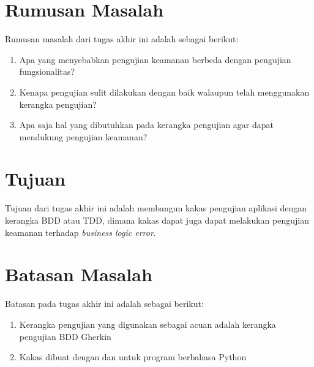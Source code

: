 \section{Rumusan Masalah}

Rumusan masalah dari tugas akhir ini adalah sebagai berikut:

\begin{enumerate}
      \item Apa yang menyebabkan pengujian keamanan berbeda dengan pengujian fungsionalitas?
      \item Kenapa pengujian sulit dilakukan dengan baik walaupun telah menggunakan kerangka pengujian?
      \item Apa saja hal yang dibutuhkan pada kerangka pengujian agar dapat mendukung pengujian keamanan?
\end{enumerate}

\section{Tujuan}

Tujuan dari tugas akhir ini adalah membangun kakas pengujian aplikasi
dengan kerangka BDD atau TDD, dimana kakas dapat juga dapat melakukan pengujian
keamanan terhadap \emph{business logic error}.

\section{Batasan Masalah}

Batasan pada tugas akhir ini adalah sebagai berikut:

\begin{enumerate}
      \item Kerangka pengujian yang digunakan sebagai acuan adalah kerangka pengujian BDD Gherkin

      \item Kakas dibuat dengan dan untuk program berbahasa Python
\end{enumerate}

